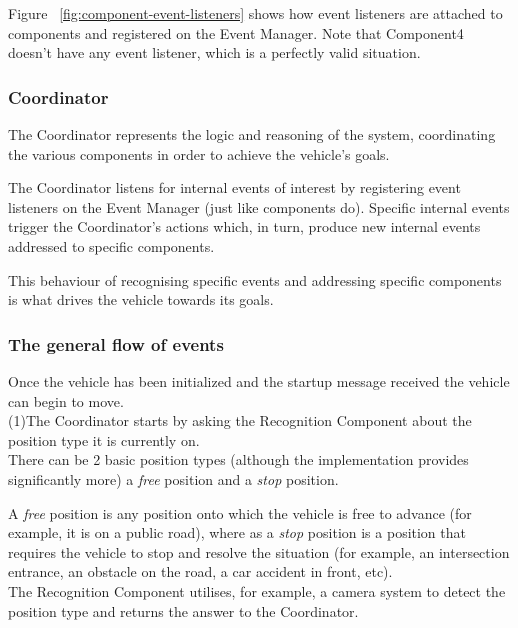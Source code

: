 \documentclass{memoir}
\begin{document}
Figure ~\ref{fig:component-event-listeners} shows how event listeners are attached to components and registered on the Event Manager.
Note that Component4 doesn't have any event listener, which is a perfectly valid situation.

\subsubsection{Coordinator}

The Coordinator represents the logic and reasoning of the system, coordinating the various components in order to achieve the vehicle’s goals.

The Coordinator listens for internal events of interest by registering event listeners on the Event Manager (just like components do).
Specific internal events trigger the Coordinator's actions which, in turn, produce new internal events addressed to specific components. 

This behaviour of recognising specific events and addressing specific components is what drives the vehicle towards its goals.

\subsubsection{The general flow of events}

Once the vehicle has been initialized and the startup message received the vehicle can begin to move. 
\\

(1)The Coordinator starts by asking the Recognition Component about the position type it is currently on. 
\\

There can be 2 basic position types (although the implementation provides significantly more) a \textit{free} position and a \textit{stop} position.

A \textit{free} position is any position onto which the vehicle is free to advance (for example, it is on a public road), where as a \textit{stop} position is a position that requires the vehicle to stop and resolve the situation (for example, an intersection entrance, an obstacle on the road, a 
car accident in front, etc).
\\

The Recognition Component utilises, for example, a camera system to detect the position type and returns the answer to the Coordinator.
\\
\end{document}
